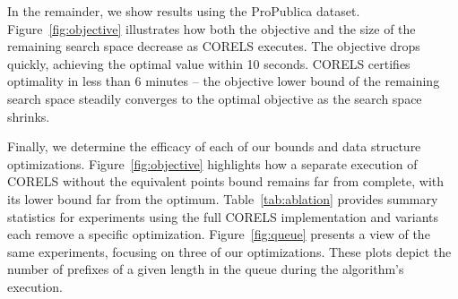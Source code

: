 \begin{kdd}
\begin{table}[t!]
\centering
{}
\vspace{4mm}
\caption{Per-component performance improvement.
%
The columns report total execution time,
time to optimum, number of queue insertions,
maximum queue size, and maximum evaluated prefix length.
%
The first row shows CORELS; subsequent rows show variants
that each remove a specific implementation optimization or bound.
%
We terminated each experiment in the last row after consuming 390-410GB RAM.
%
In all but the final row and column, we report means
(and standard deviations) over 10 cross-validation folds;
in the final row, we report the minimum values across folds.
}
\label{tab:ablation}
\vspace{-8mm}
\end{table}
\end{kdd}

In the remainder, we show results using the ProPublica dataset.
%
Figure~\ref{fig:objective} illustrates how both the objective and the size of
the remaining search space decrease as CORELS executes.
The objective drops quickly, achieving the optimal value within 10 seconds.
CORELS certifies optimality in less than 6 minutes --
the objective lower bound of the remaining search space
steadily converges to the optimal objective as the search space shrinks.

Finally, we determine the efficacy of each of our bounds and data structure optimizations.
%
Figure~\ref{fig:objective} highlights how a separate execution of CORELS without
the equivalent points bound remains far from complete,
with its lower bound far from the optimum.
%
Table~\ref{tab:ablation} provides summary statistics for experiments using
the full CORELS implementation and variants each remove a specific optimization.
%
Figure~\ref{fig:queue} presents a view of the same experiments, focusing
on three of our optimizations. These plots depict the number of
prefixes of a given length in the queue during the algorithm's execution.

